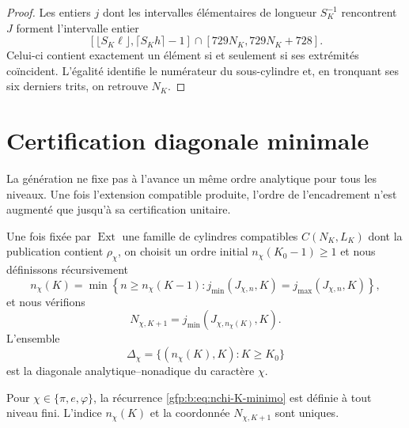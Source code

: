 \begin{proof}
Les entiers \(j\) dont les intervalles élémentaires de longueur \(S_K^{-1}\)
rencontrent \(J\) forment l’intervalle entier
\[
 \left[
 \lfloor S_K\ell\rfloor,
 \lceil S_Kh\rceil-1
 \right]\cap
 [729N_K,729N_K+728].
\]
Celui-ci contient exactement un élément si et seulement si ses extrémités coïncident.
L’égalité identifie le numérateur du sous-cylindre et, en tronquant ses six
derniers trits, on retrouve \(N_K\).
\end{proof}

\section{Certification diagonale minimale}

La génération ne fixe pas à l’avance un même ordre analytique pour tous les
niveaux. Une fois l’extension compatible produite, l’ordre de
l’encadrement n’est augmenté que jusqu’à sa certification unitaire.

\begin{definition}
\label{gfp:b:def:recurrencia-diagonal-constantes}
Une fois fixée par \(\operatorname{Ext}\) une famille de cylindres compatibles
\(C(N_K,L_K)\) dont la publication contient \(\rho_\chi\), on choisit un ordre
initial \(n_\chi(K_0-1)\geq1\) et nous définissons récursivement
\begin{equation}
 n_\chi(K)=
 \min\left\{
 n\geq n_\chi(K-1):
 j_{\min}(J_{\chi,n},K)=j_{\max}(J_{\chi,n},K)
 \right\},
 \label{gfp:b:eq:nchi-K-minimo}
\end{equation}
et nous vérifions
\begin{equation}
 N_{\chi,K+1}
 =j_{\min}(J_{\chi,n_\chi(K)},K).
 \label{gfp:b:eq:Nchi-K-mas-uno}
\end{equation}
L’ensemble
\[
 \Delta_\chi=
 \{(n_\chi(K),K):K\geq K_0\}
\]
est la diagonale analytique--nonadique du caractère \(\chi\).
\end{definition}

\begin{theorem}
\label{gfp:b:thm:existencia-unicidad-diagonal}
Pour \(\chi\in\{\pi,e,\varphi\}\), la récurrence
\eqref{gfp:b:eq:nchi-K-minimo} est définie à tout niveau fini. L’indice
\(n_\chi(K)\) et la coordonnée \(N_{\chi,K+1}\) sont uniques.
\end{theorem}


